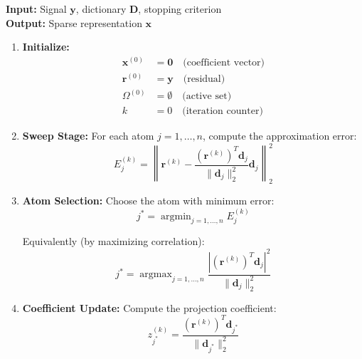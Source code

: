 \documentclass[12pt]{article}
\DeclareMathOperator{\argmin}{argmin}
\DeclareMathOperator{\argmax}{argmax}
\begin{document}
\begin{algorithm}\label{alg:matching_pursuit}
    \textbf{Input:} Signal $\mathbf{y}$, dictionary $\mathbf{D}$, stopping criterion\\
    \textbf{Output:} Sparse representation $\mathbf{x}$

    \begin{enumerate}
        \item \textbf{Initialize:}
              \begin{align}
                  \mathbf{x}^{(0)} & = \mathbf{0} \quad \text{(coefficient vector)} \\
                  \mathbf{r}^{(0)} & = \mathbf{y} \quad \text{(residual)}           \\
                  \Omega^{(0)}     & = \emptyset \quad \text{(active set)}          \\
                  k                & = 0 \quad \text{(iteration counter)}
              \end{align}

        \item \textbf{Sweep Stage:} For each atom $j = 1, \ldots, n$, compute the approximation error:
              \begin{equation}\label{eq:mp_error}
                  E_j^{(k)} = \left\|\mathbf{r}^{(k)} - \frac{(\mathbf{r}^{(k)})^T \mathbf{d}_j}{\|\mathbf{d}_j\|_2^2} \mathbf{d}_j\right\|_2^2
              \end{equation}

        \item \textbf{Atom Selection:} Choose the atom with minimum error:
              \begin{equation}\label{eq:mp_selection}
                  j^* = \argmin_{j=1,\ldots,n} E_j^{(k)}
              \end{equation}

              Equivalently (by maximizing correlation):
              \begin{equation}\label{eq:mp_correlation}
                  j^* = \argmax_{j=1,\ldots,n} \frac{|(\mathbf{r}^{(k)})^T \mathbf{d}_j|^2}{\|\mathbf{d}_j\|_2^2}
              \end{equation}

        \item \textbf{Coefficient Update:} Compute the projection coefficient:
              \begin{equation}\label{eq:mp_coefficient}
                  z_{j^*}^{(k)} = \frac{(\mathbf{r}^{(k)})^T \mathbf{d}_{j^*}}{\|\mathbf{d}_{j^*}\|_2^2}
              \end{equation}


\end{enumerate}
\end{algorithm}
\end{document}
